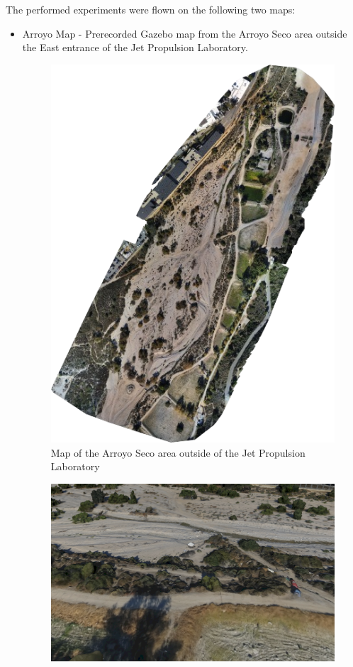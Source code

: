The performed experiments were flown on the following two maps:
\begin{itemize}
    \item Arroyo Map - Prerecorded Gazebo map from the Arroyo Seco area outside the East entrance of the Jet Propulsion Laboratory.
    \begin{figure}[h]
        \centering
        \includegraphics[scale=0.5]{images/evaluation/arroyo.png}
        \caption{Map of the Arroyo Seco area outside of the Jet Propulsion Laboratory}
    \end{figure}
    \begin{figure}[h]
        \centering
        \includegraphics[scale=0.23]{images/evaluation/arroyo_map.png}

\end{figure}
\end{itemize}
